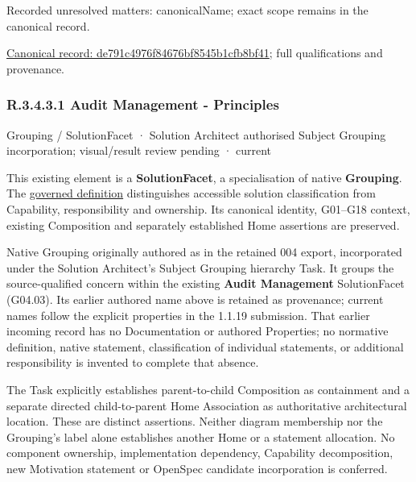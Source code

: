 {\small Recorded unresolved matters: canonicalName; exact scope remains in the canonical record.}\par
{\footnotesize \href{../../../../../../../continuum/grouping/de791c4976f84676bf8545b1cfb8bf41.md}{Canonical record: de791c4976f84676bf8545b1cfb8bf41}; full qualifications and provenance.}\par
\subsubsection*{R.3.4.3.1 Audit Management - Principles}
\label{navigation:R.3.4.3.1}

\label{element:9c613c6963e9451e945d3934a20bdd53}
{\small Grouping / SolutionFacet · Solution Architect authorised Subject Grouping incorporation; visual/result review pending · current}\par

This existing element is a \textbf{SolutionFacet}, a specialisation of native
\textbf{Grouping}. The \href{\detokenize{../../../../../../../governance/continuum-representation.md#solutionfacet-classification--1119-candidate}}{governed definition}
distinguishes accessible solution classification from Capability, responsibility
and ownership. Its canonical identity, G01–G18 context, existing Composition
and separately established Home assertions are preserved.



Native Grouping originally authored as \texttt{} in the retained 004 export,
incorporated under the Solution Architect's Subject Grouping hierarchy Task.
It groups the source-qualified \texttt{} concern within
the existing \textbf{Audit Management} SolutionFacet (G04.03). Its earlier authored name above is retained as provenance; current names
follow the explicit properties in the 1.1.19 submission.
That earlier incoming record has no Documentation or authored Properties; no normative
definition, native statement, classification of individual statements, or
additional responsibility is invented to complete that absence.



The Task explicitly establishes parent-to-child Composition as containment and
a separate directed child-to-parent Home Association as authoritative architectural
location. These are distinct assertions. Neither diagram membership nor the
Grouping's label alone establishes another Home or a statement allocation.
No component ownership, implementation dependency, Capability decomposition,
new Motivation statement or OpenSpec candidate incorporation is conferred.



